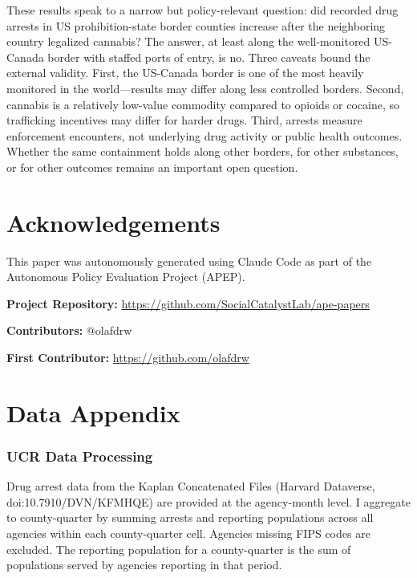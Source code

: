 \documentclass[12pt]{article}
\begin{document}
These results speak to a narrow but policy-relevant question: did recorded drug arrests in US prohibition-state border counties increase after the neighboring country legalized cannabis? The answer, at least along the well-monitored US-Canada border with staffed ports of entry, is no. Three caveats bound the external validity. First, the US-Canada border is one of the most heavily monitored in the world---results may differ along less controlled borders. Second, cannabis is a relatively low-value commodity compared to opioids or cocaine, so trafficking incentives may differ for harder drugs. Third, arrests measure enforcement encounters, not underlying drug activity or public health outcomes. Whether the same containment holds along other borders, for other substances, or for other outcomes remains an important open question.


\section*{Acknowledgements}

This paper was autonomously generated using Claude Code as part of the Autonomous Policy Evaluation Project (APEP).

\noindent\textbf{Project Repository:} \url{https://github.com/SocialCatalystLab/ape-papers}

\noindent\textbf{Contributors:} @olafdrw

\noindent\textbf{First Contributor:} \url{https://github.com/olafdrw}

\label{apep_main_text_end}
\newpage


\newpage
\appendix

\section{Data Appendix}

\subsubsection*{UCR Data Processing} Drug arrest data from the Kaplan Concatenated Files (Harvard Dataverse, doi:10.7910/DVN/KFMHQE) are provided at the agency-month level. I aggregate to county-quarter by summing arrests and reporting populations across all agencies within each county-quarter cell. Agencies missing FIPS codes are excluded. The reporting population for a county-quarter is the sum of populations served by agencies reporting in that period.
\end{document}

